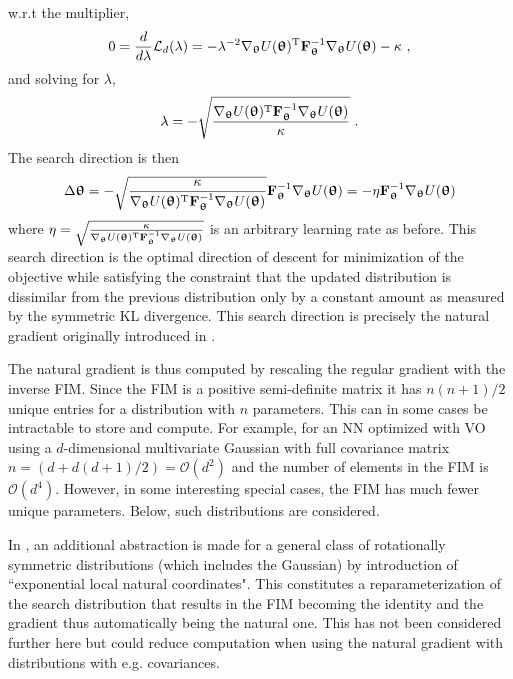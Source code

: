w.r.t the multiplier,
\begin{equation}
    0 = \frac{d}{d\lambda}\mathcal{L}_d(\lambda) = -\lambda^{-2} \nabla_\thetab U(\thetab)\transpose\F_\thetab^{-1}\nabla_\thetab U(\thetab) - \kappa \ ,
\end{equation}
and solving for $\lambda$,
\begin{equation}
    \lambda = -\sqrt{\frac{\nabla_\thetab U(\thetab)\transpose\F_\thetab^{-1}\nabla_\thetab U(\thetab)}{\kappa}} \ .
\end{equation}
The search direction is then
\begin{equation}
    \Delta{\boldsymbol{\uptheta}} = -\sqrt{\frac{\kappa}{\nabla_{\boldsymbol{\uptheta}} U({\boldsymbol{\uptheta}}){^\mathrm{T}}{\mathbf{F}}_{\boldsymbol{\uptheta}}^{-1}\nabla_{\boldsymbol{\uptheta}} U({\boldsymbol{\uptheta}})}}{\mathbf{F}}_{\boldsymbol{\uptheta}}^{-1}\nabla_{\boldsymbol{\uptheta}} U({\boldsymbol{\uptheta}}) = -\eta{\mathbf{F}}_{\boldsymbol{\uptheta}}^{-1}\nabla_{\boldsymbol{\uptheta}} U({\boldsymbol{\uptheta}})
\end{equation}
where $\eta=\sqrt{\frac{\kappa}{\nabla_{\boldsymbol{\uptheta}} U({\boldsymbol{\uptheta}}){^\mathrm{T}}{\mathbf{F}}_{\boldsymbol{\uptheta}}^{-1}\nabla_{\boldsymbol{\uptheta}} U({\boldsymbol{\uptheta}})}}$ is an arbitrary learning rate as before. This search direction is the optimal direction of descent for minimization of the objective while satisfying the constraint that the updated distribution is dissimilar from the previous distribution only by a constant amount as measured by the symmetric \gls{KL} divergence. This search direction is precisely the natural gradient originally introduced in \cite{Amari1998}.

The natural gradient is thus computed by rescaling the regular gradient with the inverse \gls{FIM}. Since the \gls{FIM} is a positive semi-definite matrix it has $n(n+1)/2$ unique entries for a distribution with $n$ parameters. This can in some cases be intractable to store and compute. For example, for an \gls{NN} optimized with \gls{VO} using a $d$-dimensional multivariate Gaussian with full covariance matrix $n=(d+d(d+1)/2)=\mathcal{O}(d^2)$ and the number of elements in the \gls{FIM} is $\mathcal{O}(d^4)$. 
However, in some interesting special cases, the \gls{FIM} has much fewer unique parameters. Below, such distributions are considered. 

In \cite{Wierstra2008}, an additional abstraction is made for a general class of rotationally symmetric distributions (which includes the Gaussian) by introduction of ``exponential local natural coordinates". This constitutes a reparameterization of the search distribution that results in the \gls{FIM} becoming the identity and the gradient thus automatically being the natural one. This has not been considered further here but could reduce computation when using the natural gradient with distributions with e.g. covariances.

